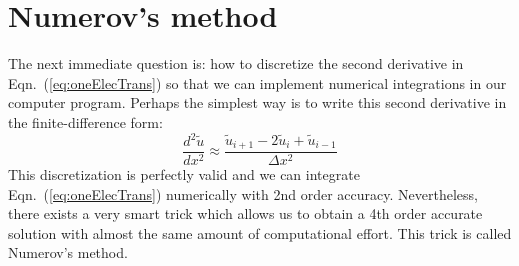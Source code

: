 \section{Numerov's method}
The next immediate question is: how to discretize the second derivative in
Eqn.~(\ref{eq:oneElecTrans}) so that we can implement numerical integrations
in our computer program. Perhaps the simplest way is to write this second
derivative in the finite-difference form:
\begin{equation} \label{eq:FD}
\frac{d^2\tilde{u}}{dx^2} \approx \frac{\tilde{u}_{i+1} - 2\tilde{u}_i + \tilde{u}_{i-1}}{\Delta x^2}
\end{equation}
%
This discretization is perfectly valid and we can integrate
Eqn.~(\ref{eq:oneElecTrans}) numerically with 2nd order accuracy.
Nevertheless, there exists a very smart trick which allows us to obtain a 4th
order accurate solution with almost the same amount of computational effort.
This trick is called Numerov's method.

